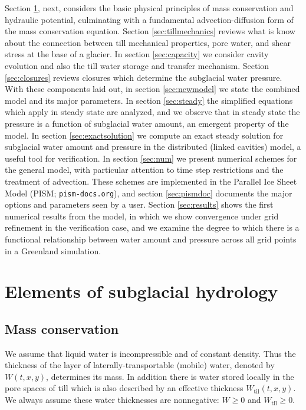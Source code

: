 \documentclass[gmd]{copernicus}   %
\newcommand{\text}{\textrm}
\newcommand{\Wtil}{W_{\text{til}}}
\begin{document}
Section \ref{sec:elements}, next, considers the basic physical principles of mass conservation and hydraulic potential, culminating with a fundamental advection-diffusion form of the mass conservation equation.  Section \ref{sec:tillmechanics} reviews what is know about the connection between till mechanical properties, pore water, and shear stress at the base of a glacier.  In section \ref{sec:capacity} we consider cavity evolution and also the till water storage and transfer mechanism.  Section \ref{sec:closures} reviews closures which determine the subglacial water pressure.  With these components laid out, in section \ref{sec:newmodel} we state the combined model and its major parameters.  In section \ref{sec:steady} the simplified equations which apply in steady state are analyzed, and we observe that in steady state the pressure is a function of subglacial water amount, an emergent property of the model.  In section \ref{sec:exactsolution} we compute an exact steady solution for subglacial water amount and pressure in the distributed (linked cavities) model, a useful tool for verification.  In section \ref{sec:num} we present numerical schemes for the general model, with particular attention to time step restrictions and the treatment of advection.  These schemes are implemented in the Parallel Ice Sheet Model (PISM; \texttt{pism-docs.org}), and section \ref{sec:pismdoc} documents the major options and parameters seen by a user.  Section \ref{sec:results} shows the first numerical results from the model, in which we show convergence under grid refinement in the verification case, and we examine the degree to which there is a functional relationship between water amount and pressure across all grid points in a Greenland simulation.


\section{Elements of subglacial hydrology} \label{sec:elements}

\subsection{Mass conservation}  We assume that liquid water is incompressible and of constant density.  Thus the thickness of the layer of laterally-transportable (mobile) water, denoted by $W(t,x,y)$, determines its mass.  In addition there is water stored locally in the pore spaces of till \citep{Tulaczyketal2000b} which is also described by an effective thickness $\Wtil(t,x,y)$.  We always assume these water thicknesses are nonnegative: $W \ge 0$ and $\Wtil \ge 0$.
\end{document}
